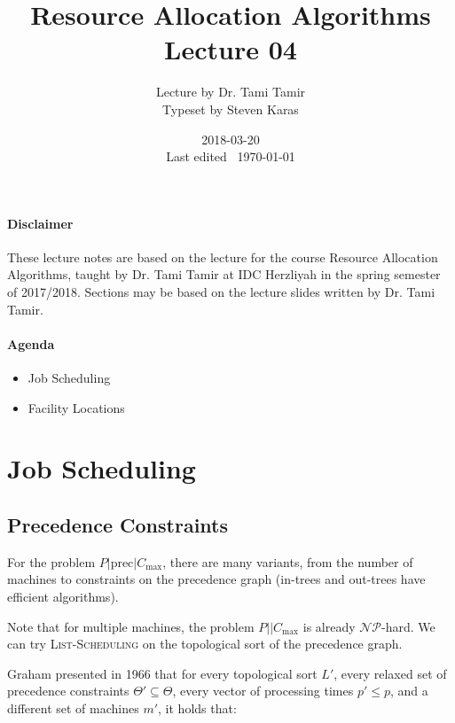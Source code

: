 \documentclass{idc_msc}
\title{Resource Allocation Algorithms\\\large Lecture 04}
\date{2018-03-20 \\ Last edited \currenttime\ \today}
\author{Lecture by Dr. Tami Tamir\\Typeset by Steven Karas}
\newcommand{\NPclass}{\mathcal{NP}}
\begin{document}
\maketitle

\nocite{pinedo2016scheduling}

\paragraph{Disclaimer}

These lecture notes are based on the lecture for the course Resource Allocation Algorithms, taught by Dr. Tami Tamir at IDC Herzliyah in the spring semester of 2017/2018.
Sections may be based on the lecture slides written by Dr. Tami Tamir.

\paragraph{Agenda}

\begin{itemize}
  \item Job Scheduling
  \item Facility Locations
\end{itemize}


\section{Job Scheduling}

\subsection{Precedence Constraints}

For the problem \(P|\text{prec}|C_{\max}\), there are many variants, from the number of machines to constraints on the precedence graph (in-trees and out-trees have efficient algorithms).

Note that for multiple machines, the problem \(P||C_{\max}\) is already \(\NPclass\)-hard.
We can try \textsc{List-Scheduling} on the topological sort of the precedence graph.

Graham presented in 1966 that for every topological sort \(L'\), every relaxed set of precedence constraints \(\Theta' \subseteq \Theta\), every vector of processing times \(p' \le p\), and a different set of machines \(m'\), it holds that:
\end{document}
